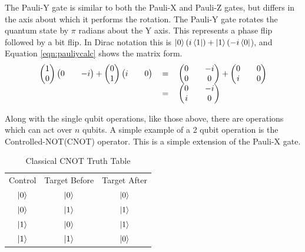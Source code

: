 The Pauli-Y gate is similar to both the Pauli-X and Pauli-Z gates, but differs in the axis about which it performs the rotation.
The Pauli-Y gate rotates the quantum state by $\pi$ radians about the Y axis.
This represents a phase flip followed by a bit flip.
In Dirac notation this is $\left\vert{0}\right\rangle(i\left\langle{1}\right\vert) + \left\vert{1}\right\rangle(-i\left\langle{0}\right\vert$), and Equation \ref{eqn:pauliycalc} shows the matrix form.
\begin{equation}
\label{eqn:pauliycalc}
\begin{tabular}{ r c l }
\(\begin {pmatrix}
1 \\
0
\end{pmatrix}
\begin {pmatrix}
0 &&
-i
\end{pmatrix}
 + 
\begin {pmatrix}
0 \\
1
\end{pmatrix}
\begin {pmatrix}
i &&
0
\end{pmatrix}\)
& \(=\)
& \( 
\begin{pmatrix}
0 && -i \\
0 && 0
\end{pmatrix}
 + 
\begin{pmatrix}
0 && 0\\
i && 0
\end{pmatrix}
\) \\
& \(=\)
& \( 
\begin{pmatrix}
0 && -i \\
i && 0
\end{pmatrix}
\)
\end{tabular}
\end{equation}

Along with the single qubit operations, like those above, there are operations which can act over $n$ qubits.
A simple example of a 2 qubit operation is the Controlled-NOT(CNOT) operator.
This is a simple extension of the Pauli-X gate.

\begin{table}
\centering
\begin{tabular}{ c | c || c | }
Control & Target Before & Target After \\
$\left\vert{0}\right\rangle$ & $\left\vert{0}\right\rangle$ & $\left\vert{0}\right\rangle$ \\
$\left\vert{0}\right\rangle$ & $\left\vert{1}\right\rangle$ & $\left\vert{1}\right\rangle$ \\
$\left\vert{1}\right\rangle$ & $\left\vert{0}\right\rangle$ & $\left\vert{1}\right\rangle$ \\
$\left\vert{1}\right\rangle$ & $\left\vert{1}\right\rangle$ & $\left\vert{0}\right\rangle$ \\
\end{tabular}
\caption{Classical CNOT Truth Table}
\label{CNOTTruthTable}
\end{table}

